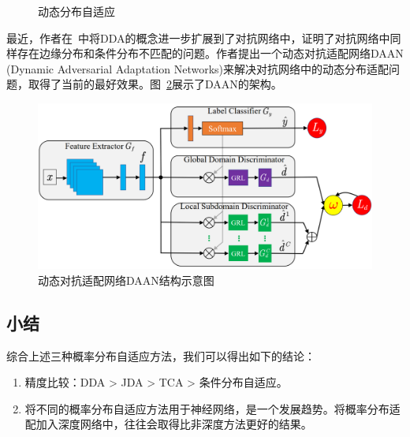\begin{figure}[h]
	\centering
	
	\caption{动态分布自适应}
	\label{fig-distribution-dda}
\end{figure}

最近，作者在~\cite{yu2019transfer}中将DDA的概念进一步扩展到了对抗网络中，证明了对抗网络中同样存在边缘分布和条件分布不匹配的问题。作者提出一个动态对抗适配网络DAAN (Dynamic Adversarial Adaptation Networks)来解决对抗网络中的动态分布适配问题，取得了当前的最好效果。图~\ref{fig-daan}展示了DAAN的架构。

\begin{figure}[htbp]
	\centering
	\includegraphics[scale=.35]{./figures/fig-distribution-daan.png}
	\caption{动态对抗适配网络DAAN结构示意图}
	\label{fig-daan}
\end{figure}

\subsection{小结}

综合上述三种概率分布自适应方法，我们可以得出如下的结论：

\begin{enumerate}
	\item 精度比较：DDA > JDA > TCA > 条件分布自适应。
	\item 将不同的概率分布自适应方法用于神经网络，是一个发展趋势。将概率分布适配加入深度网络中，往往会取得比非深度方法更好的结果。
\end{enumerate}

